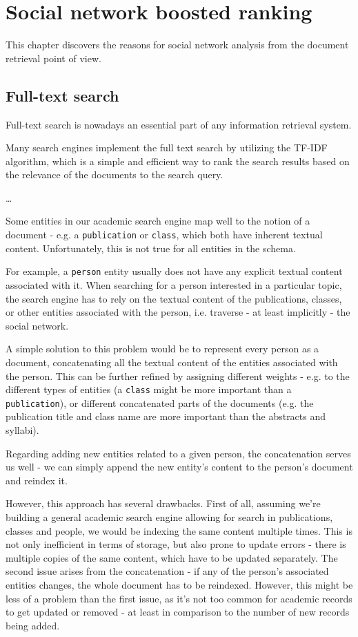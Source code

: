 \chapter{Social network boosted ranking}

This chapter discovers the reasons for social network analysis from the document retrieval point of view.

\section{Full-text search}

Full-text search is nowadays an essential part of any information retrieval system. 

Many search engines implement the full text search by utilizing the TF-IDF algorithm, which is a simple and efficient way to rank the search results based on the relevance of the documents to the search query.

\dots

Some entities in our academic search engine map well to the notion of a document - e.g. a \texttt{publication} or \texttt{class}, which both have inherent textual content.
Unfortunately, this is not true for all entities in the schema. 

For example, a \texttt{person} entity usually does not have any explicit textual content associated with it. When searching for a person interested in a particular topic, the search engine 
has to rely on the textual content of the publications, classes, or other entities associated with the person, i.e. traverse - at least implicitly - the social network.

A simple solution to this problem would be to represent every person as a document, concatenating all the textual content of the entities associated with the person.
This can be further refined by assigning different weights - e.g. to the different types of entities (a \texttt{class} might be more important than a \texttt{publication}), 
or different concatenated parts of the documents (e.g. the publication title and class name are more important than the abstracts and syllabi).

Regarding adding new entities related to a given person, the concatenation serves us well - we can simply append the new entity's content to the person's document and reindex it.

However, this approach has several drawbacks. First of all, assuming we're building a general academic search engine allowing for search in publications, classes and people, we would be indexing the same content multiple times.
This is not only inefficient in terms of storage, but also prone to update errors - there is multiple copies of the same content, which have to be updated separately.
The second issue arises from the concatenation - if any of the person's associated entities changes, the whole document has to be reindexed.
However, this might be less of a problem than the first issue, as it's not too common for academic records to get updated or removed - at least in comparison to the number of new records being added.

